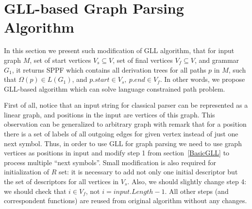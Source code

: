 \section{GLL-based Graph Parsing Algorithm}


In this section we present such modification of GLL algorithm, that for input graph $M$, set of start vertices $V_s\subseteq V$, set of final vertices $V_f\subseteq V$, and grammar $G_1$, it returns SPPF which contains all derivation trees for all paths $p$ in $M$, such that $\Omega(p) \in L(G_1)$, and $p.start \in V_s,\ p.end \in V_f$.
In other words, we propose GLL-based algorithm which can solve language constrained path problem.

First of all, notice that an input string for classical parser can be represented as a linear graph, and positions in the input are vertices of this graph.
This observation can be generalized to arbitrary graph with remark that for a position there is a set of labels of all outgoing edges for given vertex instead of just one next symbol. 
Thus, in order to use GLL for graph parsing we need to use graph vertices as positions in input and modify step 1 from section~\ref{BasicGLL} to process multiple ``next symbols''.
Small modification is also required for initialization of $R$ set: it is necessary to add not only one initial descriptor but the set of descriptors for all vertices in $V_s$.
Also, we should slightly change step 4: we should check that $i \in V_f$, not $i = input.Length - 1$.
All other steps (and correspondent functions) are reused from original algorithm without any changes.

